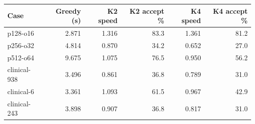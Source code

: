 \begin{tabular}{lrrrrr}
\toprule
Case & Greedy (s) & K2 speed & K2 accept \% & K4 speed & K4 accept \% \\
\midrule
p128-o16 & 2.871 & 1.316 & 83.3 & 1.361 & 81.2 \\
p256-o32 & 4.814 & 0.870 & 34.2 & 0.652 & 27.0 \\
p512-o64 & 9.675 & 1.075 & 76.5 & 0.950 & 56.2 \\
clinical-938 & 3.496 & 0.861 & 36.8 & 0.789 & 31.0 \\
clinical-6 & 3.361 & 1.093 & 61.5 & 0.967 & 42.9 \\
clinical-243 & 3.898 & 0.907 & 36.8 & 0.817 & 31.0 \\
\bottomrule
\end{tabular}
